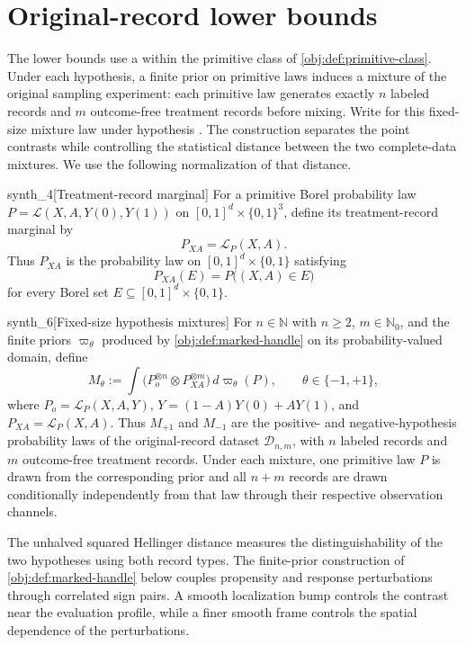 \section{Original-record lower bounds}\label{sec:original-record-lower-bounds}

The lower bounds use a  within the primitive class of \cref{obj:def:primitive-class}. Under each hypothesis, a finite prior on primitive laws induces a mixture of the original sampling experiment: each primitive law generates exactly \(n\) labeled records and \(m\) outcome-free treatment records before mixing. Write  for this fixed-size mixture law under hypothesis . The construction separates the point contrasts while controlling the statistical distance between the two complete-data mixtures. We use the following normalization of that distance.

\begin{definitionv}{synth_4}[Treatment-record marginal]
For a primitive Borel probability law
\(P=\mathcal L(X,A,Y(0),Y(1))\) on
\([0,1]^d\times\{0,1\}^3\), define its treatment-record marginal by
\[
P_{XA}=\mathcal L_P(X,A).
\]
Thus \(P_{XA}\) is the probability law on \([0,1]^d\times\{0,1\}\) satisfying
\[
P_{XA}(E)=P\bigl((X,A)\in E\bigr)
\]
for every Borel set \(E\subseteq[0,1]^d\times\{0,1\}\).
\end{definitionv}

\begin{definitionv}{synth_6}[Fixed-size hypothesis mixtures]
For \(n\in\mathbb N\) with \(n\ge2\), \(m\in\mathbb N_0\), and the finite priors \(\varpi_\theta\) produced by \cref{obj:def:marked-handle} on its probability-valued domain, define
\[
M_\theta
:=\int\bigl(P_o^{\otimes n}\otimes P_{XA}^{\otimes m}\bigr)\,d\varpi_\theta(P),
\qquad \theta\in\{-1,+1\},
\]
where \(P_o=\mathcal L_P(X,A,Y)\), \(Y=(1-A)Y(0)+AY(1)\), and \(P_{XA}=\mathcal L_P(X,A)\). Thus \(M_{+1}\) and \(M_{-1}\) are the positive- and negative-hypothesis probability laws of the original-record dataset \(\mathcal D_{n,m}\), with \(n\) labeled records and \(m\) outcome-free treatment records. Under each mixture, one primitive law \(P\) is drawn from the corresponding prior and all \(n+m\) records are drawn conditionally independently from that law through their respective observation channels.
\end{definitionv}

The unhalved squared Hellinger distance  measures the distinguishability of the two hypotheses using both record types. The finite-prior construction  of \cref{obj:def:marked-handle} below couples propensity and response perturbations through correlated sign pairs. A smooth localization bump controls the contrast near the evaluation profile, while a finer smooth frame controls the spatial dependence of the perturbations.

